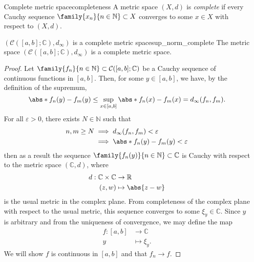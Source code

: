 \begin{definition}{Complete metric space}{completeness}
    A metric space \((X, d)\) is \emph{complete} if every Cauchy sequence \(\family{x_n}{n \in \mathbb{N}} \subset X\) converges to some \(x \in X\) with respect to \((X, d)\).
\end{definition}

\begin{example}{\((\mathcal{C}([a,b];\mathbb{C}), d_\infty)\) is a complete metric space}{sup_norm_complete}
    The metric space \((\mathcal{C}([a,b];\mathbb{C}), d_\infty)\) is a complete metric space.
\end{example}
\begin{proof}
    Let \(\family{f_n}{n \in \mathbb{N}} \subset \mathcal{C}([a,b];\mathbb{C})\) be a Cauchy sequence of continuous functions in \([a,b]\). Then, for some \(y \in [a,b]\), we have, by the definition of the supremum,
    \begin{equation*}
        \abs*{f_n(y) - f_m(y)} \leq \sup_{x \in [a,b]} \abs*{f_n(x) - f_m(x)} = d_\infty(f_n, f_m).
    \end{equation*}
    For all \(\varepsilon > 0\), there exists \(N \in \mathbb{N}\) such that
    \begin{align*}
        n,m \geq N &\implies d_\infty(f_n, f_m) < \varepsilon\\
                   &\implies \abs*{f_n(y) - f_m(y)} < \varepsilon
    \end{align*}
    then as a result the sequence \(\family{f_n(y)}{n \in \mathbb{N}} \subset \mathbb{C}\) is Cauchy with respect to the metric space \((\mathbb{C}, d)\), where
    \begin{align*}
        d : \mathbb{C} \times \mathbb{C} &\to \mathbb{R}\\
        (z,w) &\mapsto \abs{z-w}
    \end{align*}
    is the usual metric in the complex plane. From completeness of the complex plane with respect to the usual metric, this sequence converges to some \(\xi_y \in \mathbb{C}\). Since \(y\) is arbitrary and from the uniqueness of convergence, we may define the map
    \begin{align*}
        f : [a,b] &\to \mathbb{C}\\
                y &\mapsto \xi_y.
    \end{align*}
    We will show \(f\) is continuous in \([a,b]\) and that \(f_n \to f\).


\end{proof}

